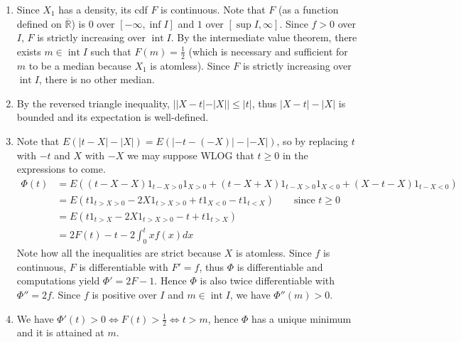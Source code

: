 \documentclass[a4paper,11pt]{article}
\DeclareMathOperator*{\inte}{int}
\begin{document}
\begin{enumerate}
  \item Since $X_1$ has a density, its cdf $F$ is continuous. Note that $F$ (as a function defined on $\overline{\mathbb R}$) is $0$ over $[-\infty, \inf I]$ and $1$ over $[\sup I, \infty]$. Since $f>0$ over $I$, $F$ is strictly increasing over $\inte I$. By the intermediate value theorem, there exists $m\in \inte I$ such that $F(m)=\frac 12$ (which is necessary and sufficient for $m$ to be a median because $X_1$ is atomless). Since $F$ is strictly increasing over $\inte I$, there is no other median.
  \item By the reversed triangle inequality, $||X-t|-|X|| \leq |t|$, thus $|X-t|-|X|$ is bounded and its expectation is well-defined.
  \item Note that $E(|t-X|-|X|) = E(|-t-(-X)|-|-X|)$, so by replacing $t$ with $-t$ and $X$ with $-X$ we may suppose WLOG that $t\geq 0$ in the expressions to come.
  $$\begin{aligned}
    \Phi(t) &= E((t-X-X)1_{t-X>0}1_{X>0} + (t-X+X)1_{t-X>0}1_{X<0} + (X-t-X)1_{t-X<0})\\
    &= E(t1_{t>X>0} -2X1_{t>X>0} + t1_{X<0} -t1_{t<X}) \qquad \text{since } t\geq 0\\
    &= E(t1_{t>X} -2X1_{t>X>0} -t + t1_{t>X})\\
    &= 2F(t) -t-2\int_0^t xf(x) dx
  \end{aligned}$$
  Note how all the inequalities are strict because $X$ is atomless. Since $f$ is continuous, $F$ is differentiable with $F'=f$, thus $\Phi$ is differentiable and computations yield $\Phi'=2F-1$. Hence $\Phi$ is also twice differentiable with $\Phi''=2f$. Since $f$ is positive over $I$ and $m\in \inte I$, we have $\Phi''(m)>0$.
  \item We have $\Phi'(t)>0 \iff F(t)>\frac 12\iff t>m$, hence $\Phi$ has a unique minimum and it is attained at $m$.
\end{enumerate}
\end{document}
